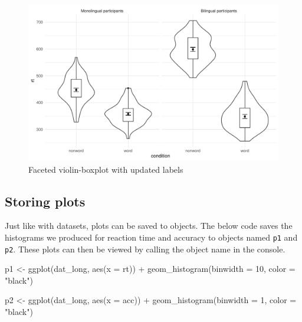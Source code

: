 \documentclass[
  english,
  doc,floatsintext]{apa6}
\newenvironment{Shaded}{\begin{snugshade}}{\end{snugshade}}
\newcommand{\AttributeTok}[1]{\textcolor[rgb]{0.77,0.63,0.00}{#1}}
\newcommand{\DecValTok}[1]{\textcolor[rgb]{0.00,0.00,0.81}{#1}}
\newcommand{\FunctionTok}[1]{\textcolor[rgb]{0.00,0.00,0.00}{#1}}
\newcommand{\NormalTok}[1]{#1}
\newcommand{\OtherTok}[1]{\textcolor[rgb]{0.56,0.35,0.01}{#1}}
\newcommand{\SpecialCharTok}[1]{\textcolor[rgb]{0.00,0.00,0.00}{#1}}
\newcommand{\StringTok}[1]{\textcolor[rgb]{0.31,0.60,0.02}{#1}}
\begin{document}
\begin{figure}

{\centering \includegraphics[width=1\linewidth]{images/violin-facet-1} 

}

\caption{Faceted violin-boxplot with updated labels}\label{fig:violin-facet}
\end{figure}

\hypertarget{storing-plots}{%
\subsection{Storing plots}\label{storing-plots}}

Just like with datasets, plots can be saved to objects. The below code saves the histograms we produced for reaction time and accuracy to objects named \texttt{p1} and \texttt{p2}. These plots can then be viewed by calling the object name in the console.

\begin{Shaded}
\begin{Highlighting}[]
\NormalTok{p1 }\OtherTok{\textless{}{-}} \FunctionTok{ggplot}\NormalTok{(dat\_long, }\FunctionTok{aes}\NormalTok{(}\AttributeTok{x =}\NormalTok{ rt)) }\SpecialCharTok{+}
  \FunctionTok{geom\_histogram}\NormalTok{(}\AttributeTok{binwidth =} \DecValTok{10}\NormalTok{, }\AttributeTok{color =} \StringTok{"black"}\NormalTok{)}

\NormalTok{p2 }\OtherTok{\textless{}{-}} \FunctionTok{ggplot}\NormalTok{(dat\_long, }\FunctionTok{aes}\NormalTok{(}\AttributeTok{x =}\NormalTok{ acc)) }\SpecialCharTok{+}
  \FunctionTok{geom\_histogram}\NormalTok{(}\AttributeTok{binwidth =} \DecValTok{1}\NormalTok{, }\AttributeTok{color =} \StringTok{"black"}\NormalTok{) }
\end{Highlighting}
\end{Shaded}
\end{document}
